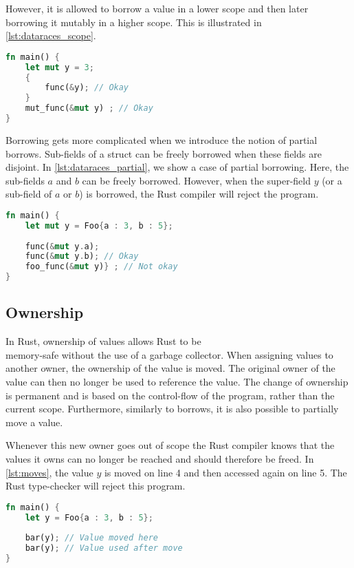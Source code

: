 However, it is allowed to borrow a value in a lower scope and then later borrowing it mutably in a higher scope. This is illustrated in \autoref{lst:dataraces_scope}.

 \begin{lstlisting}[language=rust, showstringspaces=false, escapechar=~, label={lst:dataraces_scope}, caption={Example of scoped borrow}]
fn main() { 
    let mut y = 3;
    {
        func(&y); // Okay
    }
    mut_func(&mut y) ; // Okay 
}
\end{lstlisting}

Borrowing gets more complicated when we introduce the notion of partial borrows. Sub-fields of a struct can be freely borrowed when these fields are disjoint. In \autoref{lst:dataraces_partial}, we show a case of partial borrowing. Here, the sub-fields $a$ and $b$ can be freely borrowed. However, when the super-field $y$ (or a sub-field of $a$ or $b$) is borrowed, the Rust compiler will reject the program.
 \begin{lstlisting}[language=rust, showstringspaces=false, escapechar=~, label={lst:dataraces_partial}, caption={Example of partial borrows}]
fn main() { 
    let mut y = Foo{a : 3, b : 5};
    
    func(&mut y.a);
    func(&mut y.b); // Okay
    foo_func(&mut y)} ; // Not okay 
}
\end{lstlisting}

\subsection{Ownership} \label{sec:ownership}
In Rust, ownership of values allows Rust to be\\ memory-safe without the use of a garbage collector\cite{rust_book_ownership}. When assigning values to another owner, the ownership of the value is moved. The original owner of the value can then no longer be used to reference the value. The change of ownership is permanent and is based on the control-flow of the program, rather than the current scope. Furthermore, similarly to borrows, it is also possible to partially move a value.

Whenever this new owner goes out of scope the Rust compiler knows that the values it owns can no longer be reached and should therefore be freed. 
In \autoref{lst:moves}, the value $y$ is moved on line 4 and then accessed again on line 5. The Rust type-checker will reject this program. 
    
\begin{lstlisting}[language=rust, showstringspaces=false, escapechar=~, label={lst:moves}, caption={Example of moving variables}]
fn main() { 
    let y = Foo{a : 3, b : 5};
    
    bar(y); // Value moved here
    bar(y); // Value used after move
}
\end{lstlisting}

